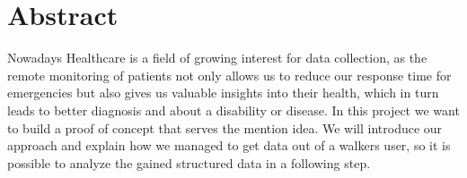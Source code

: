 \begingroup
\let\clearpage\relax
\let\cleardoublepage\relax
\let\cleardoublepage\relax

\chapter*{Abstract}
\bigskip
\bigskip
\bigskip
Nowadays Healthcare is a field of growing interest for data collection, as the remote monitoring of patients not only allows us to reduce our response time for emergencies but also gives us valuable insights into their health, which in turn leads to better diagnosis and about a disability or disease.
\bigskip
\bigskip
\bigskip
In this project we want to build a proof of concept that serves the mention idea. We will introduce our approach and explain how we managed to get data out of a walkers user, so it is possible to analyze the gained structured data in a following step.
\vfill

\endgroup			

\vfill